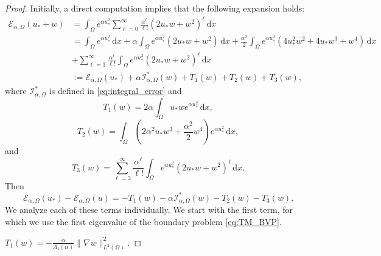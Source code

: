 \documentclass[10pt,a4paper]{amsart}
\newcommand{\ud}{\,\mathrm{d}}
\begin{document}
\begin{proof}
Initially, a direct computation implies that the following expansion holds: 
\begin{align} \label{expansion1} 
\nonumber
\mathscr{E}_{\alpha,\Omega} (u_* + w)
&= \int_\Omega e^{\alpha u_*^2} \sum_{\ell =0}^\infty \frac{\alpha^\ell}{\ell !}
(2u_* w + w^2)^\ell \ud x \\ \nonumber 
& = \int_\Omega e^{\alpha u_*^2} \ud x + \alpha \int_\Omega e^{\alpha u_*^2} 
(2u_* w + w^2) \ud x + \frac{\alpha^2}{2} \int_\Omega e^{\alpha u_*^2} (4u_*^2 w^2 
+ 4u_* w^3 + w^4) \ud x\\\nonumber
&+ \sum_{\ell=3}^\infty \frac{\alpha^\ell}{\ell !} \int_\Omega e^{\alpha u_*^2} 
(2u_* w + w^2)^\ell \ud x\\
&:=\mathscr{E}_{\alpha,\Omega} (u_*)+\alpha\mathcal{I}^*_{\alpha,\Omega}(w)+T_1(w)+T_2(w)+T_3(w),
\end{align} 
where $\mathcal{I}^*_{\alpha,\Omega}$ is defined in \eqref{eq:integral_error} and
\[
T_1(w) = 2\alpha \int_\Omega u_* w e^{\alpha u_*^2} \ud x,
\]
\[
T_2(w) = \int_{\Omega} \left (2\alpha^2 u_* w^3 + 
\frac{\alpha^2}{2} w^4 \right ) e^{\alpha u_*^2} \ud x, 
\]
and
\[
T_3(w) = \sum_{\ell=3}^\infty \frac{\alpha^\ell}{\ell !} \int_\Omega e^{\alpha u_*^2} 
(2u_* w + w^2)^\ell \ud x. 
\]
Then
\[\mathscr{E}_{\alpha,\Omega} (u_*) - \mathscr{E}_{\alpha,\Omega} (u) =-T_1(w)-\alpha\mathcal{I}^*_{\alpha,\Omega}(w)-T_2(w)-T_3(w).\]
We analyze each of these terms individually.
We start with the first term, for which we use the first eigenvalue of the boundary problem \eqref{eq:TM_BVP}. 

 $T_1(w)=-\frac{\alpha}{\Lambda_1(\alpha)}\|\nabla w\|_{L^2(\Omega)}^2$.


\end{proof}
\end{document}
